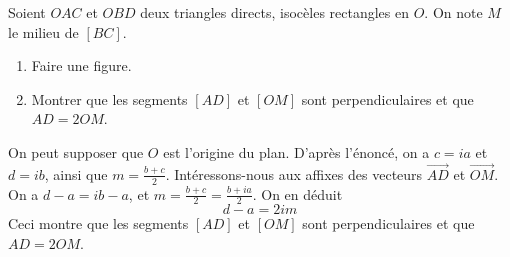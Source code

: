 \begin{exo}
Soient $OAC$ et $OBD$ deux triangles  directs, isocèles rectangles en $O$. On note $M$ le milieu de $[BC]$.
\begin{enumerate}
\item Faire une figure.
\item Montrer que les segments $[AD]$ et $[OM]$ sont perpendiculaires et que $AD=2OM$.
\end{enumerate}
\begin{sol}
On peut supposer que $O$ est l'origine du plan. D'après l'énoncé, on a $c=ia$ et $d=ib$, ainsi que $m=\frac{b+c}{2}$.
Intéressons-nous aux affixes des vecteurs $\overrightarrow{AD}$ et $\overrightarrow{OM}$. On a $d-a=ib-a$, et $m=\frac{b+c}{2}=\frac{b+ia}{2}$. On en déduit
\[ \boxed{d-a=2im}\]
Ceci montre que les segments $[AD]$ et $[OM]$ sont perpendiculaires et que $AD=2OM$.
\end{sol}
\end{exo}


